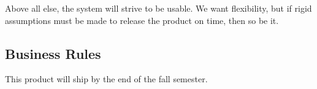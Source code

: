 \documentclass{article}
\begin{document}
Above all else, the system will strive to be usable.  We want flexibility, but if rigid assumptions must be made to release the product on time, then so be it.



\subsection{Business Rules}
This product will ship by the end of the fall semester.


\newpage






\end{document}
